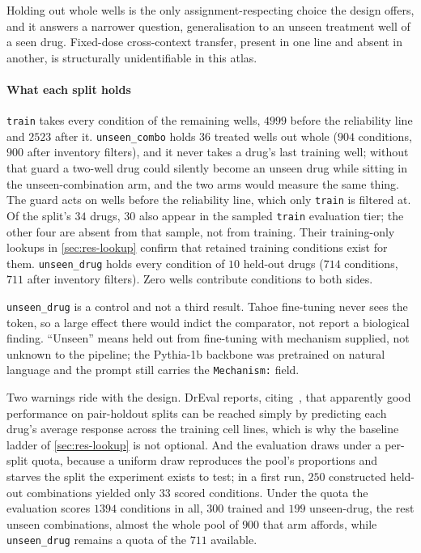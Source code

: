 Holding out whole wells is the only assignment-respecting choice the design
offers, and it answers a narrower question, generalisation to an unseen treatment
well of a seen drug. Fixed-dose cross-context transfer, present in one line and
absent in another, is structurally unidentifiable in this atlas.

\paragraph{What each split holds} \texttt{train} takes every condition of the
remaining wells, $\num{4999}$ before the reliability line and $\num{2523}$
after it.
\texttt{unseen\_combo} holds $\num{36}$ treated wells out whole ($\num{904}$
conditions, $\num{900}$ after inventory filters), and it never takes a drug's
last training well; without that guard a two-well drug could silently become an
unseen drug while sitting in the unseen-combination arm, and the two arms would
measure the same thing. The guard acts on wells before the reliability line,
which only \texttt{train} is filtered at. Of the split's $34$ drugs, $30$ also
appear in the sampled \texttt{train} evaluation tier; the other four are absent
from that sample, not from training. Their training-only lookups in
\cref{sec:res-lookup} confirm that retained training conditions exist for them.
\texttt{unseen\_drug} holds every condition of
$\num{10}$ held-out drugs ($\num{714}$ conditions, $\num{711}$ after inventory
filters). Zero wells contribute conditions to both sides.

\texttt{unseen\_drug} is a control and not a third result. Tahoe fine-tuning
never sees the token, so a large effect there would indict the comparator, not
report a biological finding. ``Unseen'' means held out from fine-tuning with
mechanism supplied, not unknown to the pipeline; the Pythia-1b backbone was
pretrained on natural language and the prompt still carries the
\texttt{Mechanism:} field.

Two warnings ride with the design. DrEval reports, citing~\cite{partin}, that
apparently good performance on pair-holdout splits can be reached simply by
predicting each drug's average response across the training cell lines, which is
why the baseline ladder of \cref{sec:res-lookup} is not optional. And the
evaluation draws under a per-split quota, because a uniform draw reproduces the
pool's proportions and starves the split the experiment exists to test; in a
first run,
$\num{250}$ constructed held-out combinations yielded only $\num{33}$ scored
conditions. Under the quota the evaluation scores $\num{1394}$ conditions in all,
$\num{300}$ trained and $\num{199}$ unseen-drug, the rest unseen combinations,
almost the whole pool of $\num{900}$ that arm affords, while
\texttt{unseen\_drug} remains a quota of the $\num{711}$ available.

